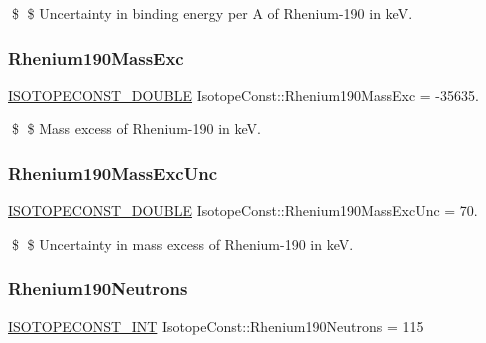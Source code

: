 \$ \$ Uncertainty in binding energy per A of Rhenium-\/190 in keV. \mbox{\label{group___isotope_const-_rhenium-_re190_ga0d93088b92d65be303d80c90a56dbc31}} 
\subsubsection{\texorpdfstring{Rhenium190\+Mass\+Exc}{Rhenium190MassExc}}
{\footnotesize\ttfamily \mbox{\hyperlink{group___isotope_const-_macros_ga8f45a7272ce02c0b4c65c44636ed719a}{I\+S\+O\+T\+O\+P\+E\+C\+O\+N\+S\+T\+\_\+\+D\+O\+U\+B\+LE}} Isotope\+Const\+::\+Rhenium190\+Mass\+Exc = -\/35635.}

\$ \$ Mass excess of Rhenium-\/190 in keV. \mbox{\label{group___isotope_const-_rhenium-_re190_ga3b90e069a9ddbacf4e380375c55006fd}} 
\subsubsection{\texorpdfstring{Rhenium190\+Mass\+Exc\+Unc}{Rhenium190MassExcUnc}}
{\footnotesize\ttfamily \mbox{\hyperlink{group___isotope_const-_macros_ga8f45a7272ce02c0b4c65c44636ed719a}{I\+S\+O\+T\+O\+P\+E\+C\+O\+N\+S\+T\+\_\+\+D\+O\+U\+B\+LE}} Isotope\+Const\+::\+Rhenium190\+Mass\+Exc\+Unc = 70.}

\$ \$ Uncertainty in mass excess of Rhenium-\/190 in keV. \mbox{\label{group___isotope_const-_rhenium-_re190_ga5b77363aaf57f4f7fa3b2ee2f8d227ae}} 
\subsubsection{\texorpdfstring{Rhenium190\+Neutrons}{Rhenium190Neutrons}}
{\footnotesize\ttfamily \mbox{\hyperlink{group___isotope_const-_macros_ga5f18360b3e99483a35c32d789e62621c}{I\+S\+O\+T\+O\+P\+E\+C\+O\+N\+S\+T\+\_\+\+I\+NT}} Isotope\+Const\+::\+Rhenium190\+Neutrons = 115}

